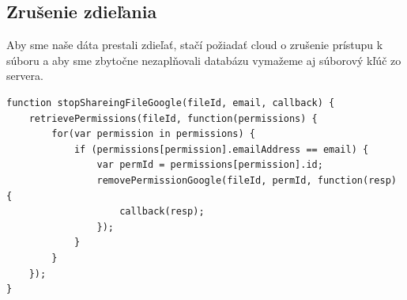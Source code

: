 	\subsection{Zrušenie zdieľania}
	
		Aby sme naše dáta prestali zdieľať, stačí požiadať cloud o zrušenie prístupu k súboru a aby sme zbytočne nezaplňovali databázu vymažeme aj súborový kľúč zo servera. 
	
\begin{lstlisting}[caption=Zrušenie zdieľania súboru]		
function stopShareingFileGoogle(fileId, email, callback) {
    retrievePermissions(fileId, function(permissions) {
        for(var permission in permissions) {
            if (permissions[permission].emailAddress == email) {
                var permId = permissions[permission].id;
                removePermissionGoogle(fileId, permId, function(resp) {
                    callback(resp);
                });
            }
        }
    });
}
\end{lstlisting}	